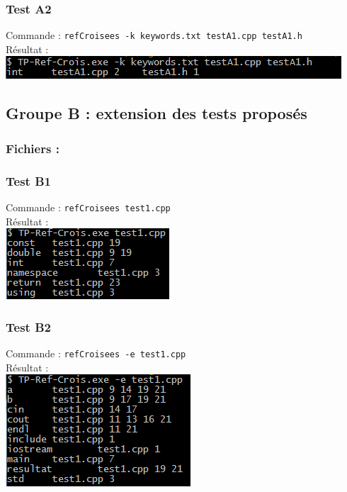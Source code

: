 \documentclass[a4paper,french,10pt,twoside]{article}
\begin{document}
\subsubsection{Test A2}
Commande : \verb!refCroisees -k keywords.txt testA1.cpp testA1.h!\\
R\'esultat :\\
\newline
\includegraphics{images/testA2.png}
\newpage

\subsection{Groupe B : extension des tests propos\'es}
\subsubsection{Fichiers :}



\newpage

\subsubsection{Test B1}
Commande : \verb!refCroisees test1.cpp!\\
R\'esultat :\\
\newline
\includegraphics{images/testB1.png}

\subsubsection{Test B2}
Commande : \verb!refCroisees -e test1.cpp!\\
R\'esultat :\\
\newline
\includegraphics{images/testB2.png}
\end{document}
